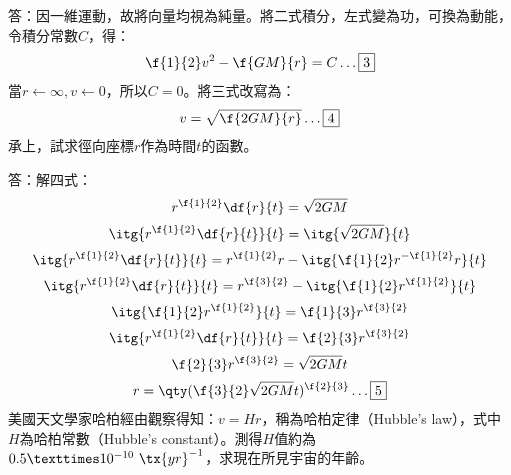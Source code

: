\documentclass[a4paper,12pt]{article}
\begin{document}
答：因一維運動，故將向量均視為純量。將二式積分，左式變為功，可換為動能，令積分常數$C$，得：
\[\f{1}{2}v^2-\f{GM}{r}=C\ldots\boxed{3}\]
當$r\leftarrow\infty,v\leftarrow 0$，所以$C=0$。將三式改寫為：
\[v=\sqrt{\f{2GM}{r}}\ldots\boxed{4}\]
承上，試求徑向座標$r$作為時間$t$的函數。 

答：解四式：
\[r^{\f{1}{2}}\df{r}{t}=\sqrt{2GM}\]
\[\itg{r^{\f{1}{2}}\df{r}{t}}{t}=\itg{\sqrt{2GM}}{t}\]
\[\itg{r^{\f{1}{2}}\df{r}{t}}{t}=r^{\f{1}{2}}r-\itg{\f{1}{2}r^{-\f{1}{2}}r}{t}\]
\[\itg{r^{\f{1}{2}}\df{r}{t}}{t}=r^{\f{3}{2}}-\itg{\f{1}{2}r^{\f{1}{2}}}{t}\]
\[\itg{\f{1}{2}r^{\f{1}{2}}}{t}=\f{1}{3}r^{\f{3}{2}}\]
\[\itg{r^{\f{1}{2}}\df{r}{t}}{t}=\f{2}{3}r^{\f{3}{2}}\]
\[\f{2}{3}r^{\f{3}{2}}=\sqrt{2GM}t\]
\[r=\qty(\f{3}{2}\sqrt{2GM}t)^{\f{2}{3}}\ldots\boxed{5}\]
美國天文學家哈柏經由觀察得知：$v=Hr$，稱為哈柏定律（Hubble's law），式中$H$為哈柏常數（Hubble's constant）。測得$H$值約為$0.5×10^{-10}\ \tx{yr}^{-1}$，求現在所見宇宙的年齡。 
\end{document}
